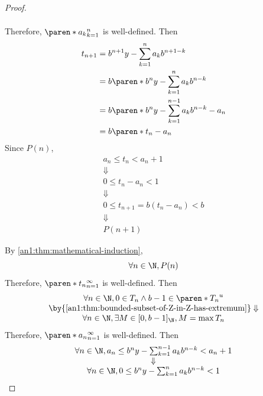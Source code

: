 \begin{proof}
\begin{itemize}
\[\begin{array}{c}
            \end{array}
          \]
          Therefore, $\paren*{a_{k}}_{k = 1}^{n}$ is well-defined. Then
          \begin{align*}
            t_{n + 1} & = b^{n + 1}y - \sum_{k = 1}^{n} a_{k}b^{n + 1 - k}               \\
                      & = b\paren*{b^{n}y - \sum_{k = 1}^{n} a_{k}b^{n - k}}             \\
                      & = b\paren*{b^{n}y - \sum_{k = 1}^{n - 1} a_{k}b^{n - k} - a_{n}} \\
                      & = b\paren*{t_{n} - a_{n}}
          \end{align*}
          Since $P(n)$,
          \[
            \begin{array}{c}
              a_{n} \leq t_{n} < a_{n} + 1            \\
              \Downarrow                              \\
              0 \leq t_{n} - a_{n} < 1                \\
              \Downarrow                              \\
              0 \leq t_{n + 1} = b(t_{n} - a_{n}) < b \\
              \Downarrow                              \\
              P(n + 1)
            \end{array}
          \]
  \end{itemize}
  By \cref{an1:thm:mathematical-induction},
  \[
    \forall n \in \N, P(n)
  \]
  Therefore, $\paren*{t_{n}}_{n = 1}^{\infty}$ is well-defined. Then
  \[
    \begin{array}{c}
      \forall n \in \N, 0 \in T_{n} \land b - 1 \in \paren*{T_{n}}^{u}     \\
      \by{\Cref{an1:thm:bounded-subset-of-Z-in-Z-has-extremum}} \Downarrow \\
      \forall n \in \N, \exists M \in [0, b - 1]_{\N}, M = \max T_{n}
    \end{array}
  \]
  Therefore, $\paren*{a_{n}}_{n = 1}^{\infty}$ is well-defined. Then
  \[
    \begin{array}{c}
      \forall n \in \N, a_{n} \leq b^{n}y - \sum_{k = 1}^{n - 1} a_{k}b^{n - k} < a_{n} + 1 \\
      \Downarrow                                                                            \\
      \forall n \in \N, 0 \leq b^{n}y - \sum_{k = 1}^{n} a_{k}b^{n - k} < 1                 \\

\end{array}\]
\end{proof}
